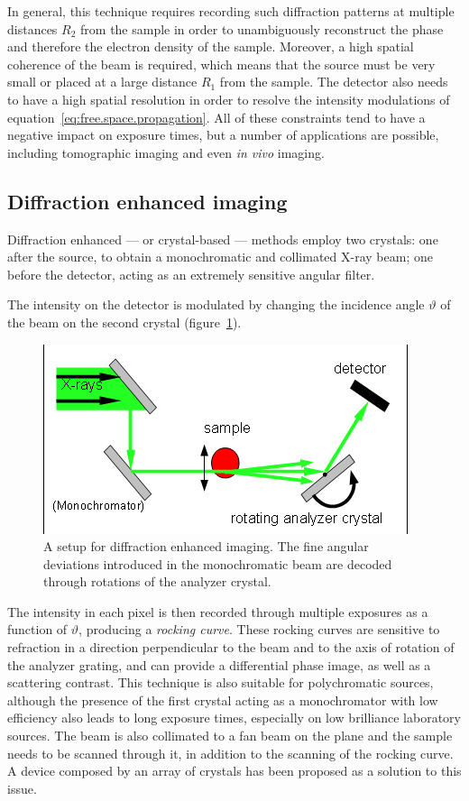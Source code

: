 In general, this technique requires recording such diffraction patterns at
multiple distances $R_2$ from the sample in order to unambiguously
reconstruct the phase and therefore the electron density of the sample.
Moreover, a high spatial coherence of the beam is required, which means
that the source must be very small or placed at a large distance $R_1$ from
the sample. The detector also needs to have a high spatial resolution in
order to resolve the intensity modulations of
equation~\eqref{eq:free.space.propagation}. All of these constraints tend to
have a negative impact on exposure times, but a number of applications are
possible, including tomographic imaging and even \emph{in vivo} imaging.

\subsection{Diffraction enhanced imaging}
Diffraction enhanced --- or crystal-based --- methods employ two crystals:
one after the source, to obtain a monochromatic and collimated X-ray beam;
one before the detector, acting as an extremely sensitive angular filter.

The intensity on the detector is modulated by changing the incidence angle
$\vartheta$ of the beam on the second crystal (figure~\ref{fig:dei}).
\begin{figure}[htb]
    \centering
    \includegraphics[width=\textwidth]{gfx/analyzer-based_imaging.png}
    \caption[Analyzer-based setup.]{A setup for diffraction enhanced
        imaging\cn. The fine angular deviations introduced in the
    monochromatic beam are decoded through rotations of the analyzer crystal.}
    \label{fig:dei}
\end{figure}
The intensity in each pixel is then recorded through multiple exposures as a
function of $\vartheta$, producing a \emph{rocking curve}. These rocking
curves are sensitive to refraction in a direction perpendicular to the beam
and to the axis of rotation of the analyzer grating, and can provide a
differential phase image, as well as a scattering contrast. This technique
is also suitable for polychromatic sources, although the presence of the
first crystal acting as a monochromator with low efficiency also leads to
long exposure times, especially on low brilliance laboratory sources. The
beam is also collimated to a fan beam on the plane and the sample needs to
be scanned through it, in addition to the scanning of the rocking curve. A
device composed by an array of crystals has been proposed as a solution to
this issue.

